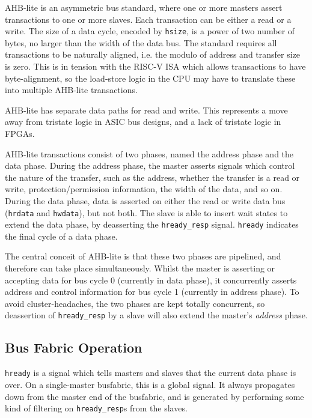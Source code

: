 \documentclass{article}
\begin{document}
AHB-lite is an asymmetric bus standard, where one or more masters assert transactions to one or more slaves. Each transaction can be either a read or a write. The size of a data cycle, encoded by \texttt{hsize}, is a power of two number of bytes, no larger than the width of the data bus. The standard requires all transactions to be naturally aligned, i.e. the modulo of address and transfer size is zero. This is in tension with the RISC-V ISA which allows transactions to have byte-alignment, so the load-store logic in the CPU may have to translate these into multiple AHB-lite transactions.

AHB-lite has separate data paths for read and write. This represents a move away from tristate logic in ASIC bus designs, and a lack of tristate logic in FPGAs.

AHB-lite transactions consist of two phases, named the address phase and the data phase. During the address phase, the master asserts signals which control the nature of the transfer, such as the address, whether the transfer is a read or write, protection/permission information, the width of the data, and so on. During the data phase, data is asserted on either the read or write data bus (\texttt{hrdata} and \texttt{hwdata}), but not both. The slave is able to insert wait states to extend the data phase, by deasserting the \texttt{hready\_resp} signal. \texttt{hready} indicates the final cycle of a data phase.

The central conceit of AHB-lite is that these two phases are pipelined, and therefore can take place simultaneously. Whilst the master is asserting or accepting data for bus cycle 0 (currently in data phase), it concurrently asserts address and control information for bus cycle 1 (currently in address phase). To avoid cluster-headaches, the two phases are kept totally concurrent, so deassertion of \texttt{hready\_resp} by a slave will also extend the master's \textit{address} phase.


\subsection{Bus Fabric Operation}

\texttt{hready} is a signal which tells masters and slaves that the current data phase is over. On a single-master busfabric, this is a global signal. It always propagates down from the master end of the busfabric, and is generated by performing some kind of filtering on \texttt{hready\_resp}s from the slaves.
\end{document}
